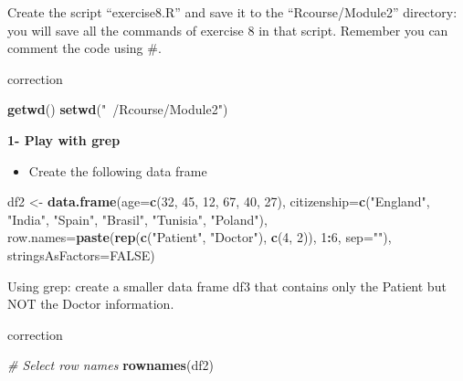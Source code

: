 \documentclass[]{book}
\newenvironment{Shaded}{\begin{snugshade}}{\end{snugshade}}
\newcommand{\CommentTok}[1]{\textcolor[rgb]{0.56,0.35,0.01}{\textit{#1}}}
\newcommand{\DataTypeTok}[1]{\textcolor[rgb]{0.13,0.29,0.53}{#1}}
\newcommand{\DecValTok}[1]{\textcolor[rgb]{0.00,0.00,0.81}{#1}}
\newcommand{\KeywordTok}[1]{\textcolor[rgb]{0.13,0.29,0.53}{\textbf{#1}}}
\newcommand{\NormalTok}[1]{#1}
\newcommand{\OperatorTok}[1]{\textcolor[rgb]{0.81,0.36,0.00}{\textbf{#1}}}
\newcommand{\OtherTok}[1]{\textcolor[rgb]{0.56,0.35,0.01}{#1}}
\newcommand{\StringTok}[1]{\textcolor[rgb]{0.31,0.60,0.02}{#1}}
\providecommand{\tightlist}{%
  \setlength{\itemsep}{0pt}\setlength{\parskip}{0pt}}
\begin{document}
Create the script ``exercise8.R'' and save it to the ``Rcourse/Module2'' directory: you will save all the commands of exercise 8 in that script.
Remember you can comment the code using \#.

correction

\begin{Shaded}
\begin{Highlighting}[]
\KeywordTok{getwd}\NormalTok{()}
\KeywordTok{setwd}\NormalTok{(}\StringTok{"~/Rcourse/Module2"}\NormalTok{)}
\end{Highlighting}
\end{Shaded}

\textbf{1- Play with grep}

\begin{itemize}
\tightlist
\item
  Create the following data frame
\end{itemize}

\begin{Shaded}
\begin{Highlighting}[]
\NormalTok{df2 <-}\StringTok{ }\KeywordTok{data.frame}\NormalTok{(}\DataTypeTok{age=}\KeywordTok{c}\NormalTok{(}\DecValTok{32}\NormalTok{, }\DecValTok{45}\NormalTok{, }\DecValTok{12}\NormalTok{, }\DecValTok{67}\NormalTok{, }\DecValTok{40}\NormalTok{, }\DecValTok{27}\NormalTok{), }
    \DataTypeTok{citizenship=}\KeywordTok{c}\NormalTok{(}\StringTok{"England"}\NormalTok{, }\StringTok{"India"}\NormalTok{, }\StringTok{"Spain"}\NormalTok{, }\StringTok{"Brasil"}\NormalTok{, }\StringTok{"Tunisia"}\NormalTok{, }\StringTok{"Poland"}\NormalTok{), }
    \DataTypeTok{row.names=}\KeywordTok{paste}\NormalTok{(}\KeywordTok{rep}\NormalTok{(}\KeywordTok{c}\NormalTok{(}\StringTok{"Patient"}\NormalTok{, }\StringTok{"Doctor"}\NormalTok{), }\KeywordTok{c}\NormalTok{(}\DecValTok{4}\NormalTok{, }\DecValTok{2}\NormalTok{)), }\DecValTok{1}\OperatorTok{:}\DecValTok{6}\NormalTok{, }\DataTypeTok{sep=}\StringTok{""}\NormalTok{),}
    \DataTypeTok{stringsAsFactors=}\OtherTok{FALSE}\NormalTok{)}
\end{Highlighting}
\end{Shaded}

Using grep: create a smaller data frame df3 that contains only the Patient but NOT the Doctor information.

correction

\begin{Shaded}
\begin{Highlighting}[]
\CommentTok{# Select row names}
\KeywordTok{rownames}\NormalTok{(df2)}
\end{Highlighting}
\end{Shaded}
\end{document}
